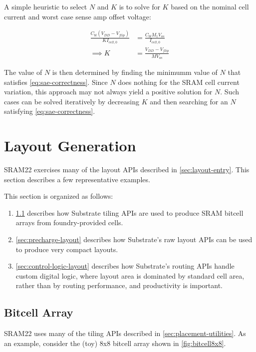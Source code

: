 A simple heuristic to select $N$ and $K$ is to solve for $K$ based on the nominal cell current and worst case
sense amp offset voltage:

\begin{align} \label{eq:k-heuristic}
\frac{C_{bl} \left( V_{DD} - V_{flip} \right) }{K I_{cell,0}}
&= \frac{C_{bl} M_1 V_{os}}{I_{cell,0}} \\
\implies K &= \frac{V_{DD} - V_{flip}}{M V_{os}}
\end{align}

The value of $N$ is then determined by finding the minimumm value of $N$ that satisfies \ref{eq:sae-correctness}.
Since $N$ does nothing for the SRAM cell current variation, this approach may not always yield a positive solution for $N$.
Such cases can be solved iteratively by decreasing $K$ and then searching for an $N$ satisfying \ref{eq:sae-correctness}.


\section{Layout Generation} \label{sec:sram-layout-generation}

SRAM22 exercises many of the layout APIs described in \ref{sec:layout-entry}.
This section describes a few representative examples.

This section is organized as follows:
\begin{enumerate}
\item \ref{sec:bitcell-array-layout} describes how Substrate tiling APIs are used to produce SRAM bitcell arrays from foundry-provided cells.
\item \ref{sec:precharge-layout} describes how Substrate's raw layout APIs can be used to produce very compact layouts.
\item \ref{sec:control-logic-layout} describes how Substrate's routing APIs handle custom digital logic, where layout area is dominated
  by standard cell area, rather than by routing performance, and productivity is important.
\end{enumerate}


\subsection{Bitcell Array} \label{sec:bitcell-array-layout}

SRAM22 uses many of the tiling APIs described in \ref{sec:placement-utilities}.
As an example, consider the (toy) 8x8 bitcell array shown in \ref{fig:bitcell8x8}.


